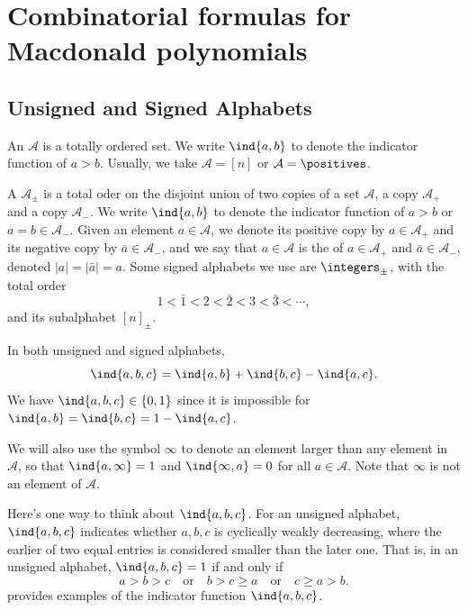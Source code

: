 \chapter{Combinatorial formulas for Macdonald polynomials}

\section{Unsigned and Signed Alphabets}

An  \(\mathcal{A}\) is a totally ordered set.
We write \(\ind{a, b}\) to denote the indicator function of \(a > b\).
Usually, we take \(\mathcal{A} = [n]\) or \(\mathcal{A} = \positives\).

A  \(\mathcal{A}_\pm\) is a total oder on the disjoint union of two copies of a set \(\mathcal{A}\), a  copy \(\mathcal{A}_+\) and a  copy \(\mathcal{A}_-\).
We write \(\ind{a, b}\) to denote the indicator function of \(a > b\) or \(a = b \in \mathcal{A}_-\).
Given an element \(a \in \mathcal{A}\), we denote its positive copy by \(a \in \mathcal{A}_+\) and its negative copy by \(\bar{a} \in \mathcal{A}_-\),
and we say that \(a \in \mathcal{A}\) is the  of \(a \in \mathcal{A}_+\) and \(\bar{a} \in \mathcal{A}_-\), denoted \(|a| = |\bar{a}| = a\).
Some signed alphabets we use are \(\integers_\pm\), with the total order
\begin{equation*}
	1 < \bar{1} < 2 < \bar{2} < 3 < \bar{3} < \cdots,
\end{equation*}
and its subalphabet \([n]_\pm\).

In both unsigned and signed alphabets,
\begin{equation*}
	\ind{a, b, c} = \ind{a, b} + \ind{b, c} - \ind{a, c}.
\end{equation*}
We have \(\ind{a, b, c} \in \{0, 1\}\) since it is impossible for \(\ind{a, b} = \ind{b, c} = 1 - \ind{a, c}\).

We will also use the symbol \(\infty\) to denote an element larger than any element in \(\mathcal{A}\), so that \(\ind{a, \infty} = 1\) and \(\ind{\infty, a} = 0\) for all \(a \in \mathcal{A}\).
Note that \(\infty\) is not an element of \(\mathcal{A}\).

Here's one way to think about \(\ind{a, b, c}\).
For an unsigned alphabet,
\(\ind{a, b, c}\) indicates whether \(a, b, c\) is cyclically weakly decreasing, where the earlier of two equal entries is considered smaller than the later one.
That is, in an unsigned alphabet,
\(\ind{a, b, c} = 1\) if and only if
\begin{equation*}
	a > b > c \quad \text{or} \quad b > c \geq a \quad \text{or} \quad c \geq a > b.
\end{equation*}
 provides examples of the indicator function \(\ind{a, b, c}\).

